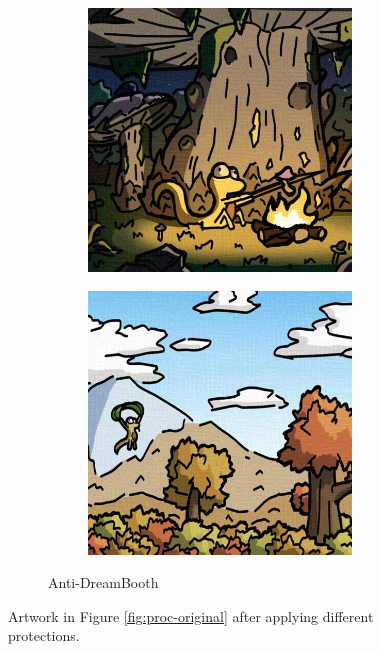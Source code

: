 \documentclass{article}
\begin{document}
\begin{figure}[h]
\begin{subfigure}[t]{\textwidth}
\begin{subfigure}[b]{0.24\textwidth}
     \end{subfigure}
     \hfill
     \begin{subfigure}[b]{0.24\textwidth}
         \centering
         \includegraphics[width=\textwidth]{plots/process/antidb/0005.jpeg}
     \end{subfigure}
     \hfill
     \begin{subfigure}[b]{0.24\textwidth}
         \centering
         \includegraphics[width=\textwidth]{plots/process/antidb/0009.jpeg}
     \end{subfigure}
    \caption{Anti-DreamBooth}
    \end{subfigure}
    \caption{Artwork in Figure \ref{fig:proc-original} after applying different protections.}
    \label{fig:proc-protections}
\end{figure}
\end{document}
